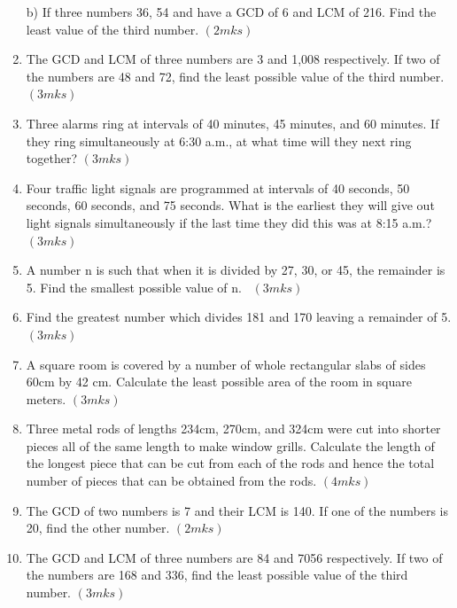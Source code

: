 \documentclass[
  a4paperpaper,
]{scrbook}
\begin{document}
\begin{tcolorbox}
\begin{enumerate}
  b) If three numbers 36, 54 and have a GCD of 6 and LCM of 216. Find
  the least value of the third number. \hspace{11.1cm} \((2mks)\)
\item
  The GCD and LCM of three numbers are 3 and 1,008 respectively. If two
  of the numbers are 48 and 72, find the least possible value of the
  third number.\hspace{5cm} \((3mks)\)
\item
  Three alarms ring at intervals of 40 minutes, 45 minutes, and 60
  minutes. If they ring simultaneously at 6:30 a.m., at what time will
  they next ring together? \hspace{3.9cm} \((3mks)\)
\item
  Four traffic light signals are programmed at intervals of 40 seconds,
  50 seconds, 60 seconds, and 75 seconds. What is the earliest they will
  give out light signals simultaneously if the last time they did this
  was at 8:15 a.m.? \hspace{8.5cm} \((3mks)\)
\item
  A number n is such that when it is divided by 27, 30, or 45, the
  remainder is 5. Find the smallest possible value of n.~\hspace{11cm}
  \((3mks)\)
\item
  Find the greatest number which divides 181 and 170 leaving a remainder
  of 5. \hspace{1.7cm} \((3mks)\)
\item
  A square room is covered by a number of whole rectangular slabs of
  sides 60cm by 42 cm. Calculate the least possible area of the room in
  square meters. \hspace{4cm} \((3mks)\)
\item
  Three metal rods of lengths 234cm, 270cm, and 324cm were cut into
  shorter pieces all of the same length to make window grills. Calculate
  the length of the longest piece that can be cut from each of the rods
  and hence the total number of pieces that can be obtained from the
  rods. \hspace{14.2cm} \((4mks)\)
\item
  The GCD of two numbers is 7 and their LCM is 140. If one of the
  numbers is 20, find the other number. \hspace{12.8cm} \((2mks)\)
\item
  The GCD and LCM of three numbers are 84 and 7056 respectively. If two
  of the numbers are 168 and 336, find the least possible value of the
  third number.\hspace{5cm} \((3mks)\)

\end{enumerate}
\end{tcolorbox}
\end{document}
